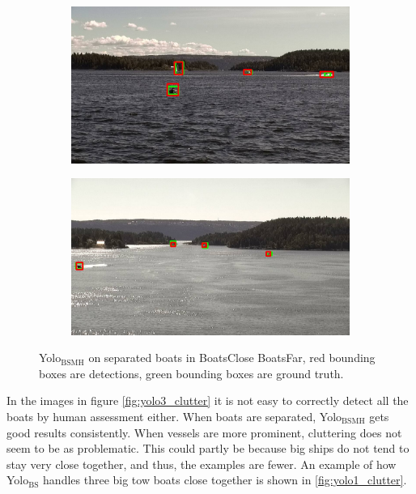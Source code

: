 \begin{figure}[h!]
\begin{subfigure}{.5\textwidth}
  \centering
  \includegraphics[width=0.8\linewidth]{discussion/good_ex/selected_08_14_frame1140.jpg}
\end{subfigure}%
\begin{subfigure}{.5\textwidth}
  \centering
  \includegraphics[width=.8\linewidth]{discussion/good_ex/selected_08_11_frame1380.jpg}
\end{subfigure}
\caption{Yolo$_{\text{BSMH}}$ on separated boats in BoatsClose BoatsFar, red bounding boxes are detections, green bounding boxes are ground truth.}
\label{fig:yolo3_good_ex}
\end{figure}

\noindent
In the images in figure \ref{fig:yolo3_clutter} it is not easy to correctly detect all the boats by human assessment either. When boats are separated, Yolo$_{\text{BSMH}}$ gets good results consistently. When vessels are more prominent, cluttering does not seem to be as problematic. This could partly be because big ships do not tend to stay very close together, and thus, the examples are fewer. An example of how Yolo$_{\text{BS}}$ handles three big tow boats close together is shown in \ref{fig:yolo1_clutter}.

